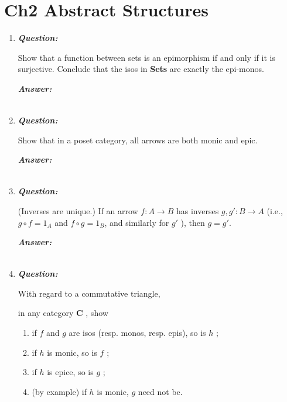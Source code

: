 \documentclass{article}
\begin{document}
\section{Ch2 Abstract Structures}

\begin{enumerate}

	\item
	      \textbf{\textit{Question:}}

	      Show that a function between sets is an epimorphism if and only if it is surjective. Conclude that the isos in \textbf{Sets} are exactly the epi-monos.

	      \textbf{\textit{Answer:}}

	      \begin{align*}
	      \end{align*}


	\item
	      \textbf{\textit{Question:}}

	      Show that in a poset category, all arrows are both monic and epic.

	      \textbf{\textit{Answer:}}

	      \begin{align*}
	      \end{align*}


	\item
	      \textbf{\textit{Question:}}

	      (Inverses are unique.) If an arrow $ f : A \to B $ has inverses $ g, g' : B \to A $ (i.e., $ g \circ f = 1_A $ and $ f \circ g = 1_B $, and similarly for $ g' $ ), then $ g = g' $.

	      \textbf{\textit{Answer:}}

	      \begin{align*}
	      \end{align*}


	\item
	      \textbf{\textit{Question:}}

	      With regard to a commutative triangle,


	      in any category \textbf{C} , show
	      \begin{enumerate}
		      \item if $ f $ and $ g $ are isos (resp. monos, resp. epis), so is $ h $ ;
		      \item if $ h $ is monic, so is $ f $ ;
		      \item if $ h $ is epice, so is $ g $ ;
		      \item (by example) if $ h $ is monic, $ g $ need not be.
	      \end{enumerate}


\end{enumerate}
\end{document}
